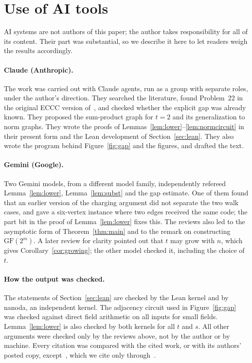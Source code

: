 \documentclass[11pt]{article}
\theoremstyle{definition}
\theoremstyle{remark}
\newcommand{\GF}{\mathrm{GF}}
\begin{document}
\appendix
\section{Use of AI tools}\label{app:ai}

AI systems are not authors of this paper; the author takes responsibility for all of its content. Their part was
substantial, so we describe it here to let readers weigh the results accordingly.

\paragraph{Claude (Anthropic).} The work was carried out with Claude agents, run as a group with separate roles, under
the author's direction. They searched the literature, found Problem~22 in the original ECCC version of~\cite{JukTR}, and
checked whether the explicit gap was already known. They proposed the sum-product graph for $t=2$ and its
generalization to norm graphs. They wrote the proofs of Lemmas~\ref{lem:lower}--\ref{lem:normcircuit} in their present
form and the Lean development of Section~\ref{sec:lean}. They also wrote the program behind Figure~\ref{fig:gap} and the
figures, and drafted the text.

\paragraph{Gemini (Google).} Two Gemini models, from a different model family, independently refereed
Lemma~\ref{lem:lower}, Lemma~\ref{lem:subst} and the gap estimate. One of them found that an earlier version of the
charging argument did not separate the two walk cases, and gave a six-vertex instance where two edges received the same
code; the part bit in the proof of Lemma~\ref{lem:lower} fixes this. The reviews also led to the asymptotic form of
Theorem~\ref{thm:main} and to the remark on constructing $\GF(2^m)$. A later review for clarity pointed out that $t$ may
grow with $n$, which gives Corollary~\ref{cor:growing}; the other model checked it, including the choice of $t$.

\paragraph{How the output was checked.} The statements of Section~\ref{sec:lean} are checked by the Lean kernel and by
nanoda, an independent kernel. The adjacency circuit used in Figure~\ref{fig:gap} was checked against direct field
arithmetic on all inputs for small fields. Lemma~\ref{lem:lower} is also checked by both kernels for all $t$ and $s$. All other arguments were checked only by the reviews above, not by the author or by machine. Every citation was compared with the cited work, or with its authors' posted copy, except~\cite{LW91}, which we cite only
through~\cite{AM06,Juk06}.
\end{document}
